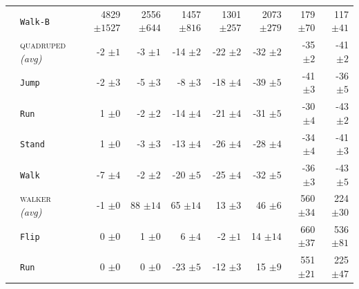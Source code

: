 \documentclass{article}
\theoremstyle{plain}
\theoremstyle{definition}
\theoremstyle{remark}
\newcommand{\domainavg}[1]{\textsc{#1} \textit{(avg)}}
\begin{document}
\begin{table}[H]
\begin{tabular}{l l r r r r r r r}
& \hspace{.5em} \texttt{Walk-B} & 4829 ${\scriptstyle \pm 1527}$ & 2556 ${\scriptstyle \pm 644}$ & 1457 ${\scriptstyle \pm 816}$ & 1301 ${\scriptstyle \pm 257}$ & 2073 ${\scriptstyle \pm 279}$ & 179 ${\scriptstyle \pm 70}$ & 117 ${\scriptstyle \pm 41}$ \\
\addlinespace
 \rowcolor{gray!15}  \cellcolor{white} & \domainavg{quadruped} & -2 ${\scriptstyle \pm 1}$ & -3 ${\scriptstyle \pm 1}$ & -14 ${\scriptstyle \pm 2}$ & -22 ${\scriptstyle \pm 2}$ & -32 ${\scriptstyle \pm 2}$ & -35 ${\scriptstyle \pm 2}$ & -41 ${\scriptstyle \pm 2}$ \\
& \hspace{.5em} \texttt{Jump} & -2 ${\scriptstyle \pm 3}$ & -5 ${\scriptstyle \pm 3}$ & -8 ${\scriptstyle \pm 3}$ & -18 ${\scriptstyle \pm 4}$ & -39 ${\scriptstyle \pm 5}$ & -41 ${\scriptstyle \pm 3}$ & -36 ${\scriptstyle \pm 5}$ \\
& \hspace{.5em} \texttt{Run} & 1 ${\scriptstyle \pm 0}$ & -2 ${\scriptstyle \pm 2}$ & -14 ${\scriptstyle \pm 4}$ & -21 ${\scriptstyle \pm 4}$ & -31 ${\scriptstyle \pm 5}$ & -30 ${\scriptstyle \pm 4}$ & -43 ${\scriptstyle \pm 2}$ \\
& \hspace{.5em} \texttt{Stand} & 1 ${\scriptstyle \pm 0}$ & -3 ${\scriptstyle \pm 3}$ & -13 ${\scriptstyle \pm 4}$ & -26 ${\scriptstyle \pm 4}$ & -28 ${\scriptstyle \pm 4}$ & -34 ${\scriptstyle \pm 4}$ & -41 ${\scriptstyle \pm 3}$ \\
& \hspace{.5em} \texttt{Walk} & -7 ${\scriptstyle \pm 4}$ & -2 ${\scriptstyle \pm 2}$ & -20 ${\scriptstyle \pm 5}$ & -25 ${\scriptstyle \pm 4}$ & -32 ${\scriptstyle \pm 5}$ & -36 ${\scriptstyle \pm 3}$ & -43 ${\scriptstyle \pm 5}$ \\
\addlinespace
 \rowcolor{gray!15}  \cellcolor{white} & \domainavg{walker} & -1 ${\scriptstyle \pm 0}$ & 88 ${\scriptstyle \pm 14}$ & 65 ${\scriptstyle \pm 14}$ & 13 ${\scriptstyle \pm 3}$ & 46 ${\scriptstyle \pm 6}$ & 560 ${\scriptstyle \pm 34}$ & 224 ${\scriptstyle \pm 30}$ \\
& \hspace{.5em} \texttt{Flip} & 0 ${\scriptstyle \pm 0}$ & 1 ${\scriptstyle \pm 0}$ & 6 ${\scriptstyle \pm 4}$ & -2 ${\scriptstyle \pm 1}$ & 14 ${\scriptstyle \pm 14}$ & 660 ${\scriptstyle \pm 37}$ & 536 ${\scriptstyle \pm 81}$ \\
& \hspace{.5em} \texttt{Run} & 0 ${\scriptstyle \pm 0}$ & 0 ${\scriptstyle \pm 0}$ & -23 ${\scriptstyle \pm 5}$ & -12 ${\scriptstyle \pm 3}$ & 15 ${\scriptstyle \pm 9}$ & 551 ${\scriptstyle \pm 21}$ & 225 ${\scriptstyle \pm 47}$ \\

\end{tabular}
\end{table}
\end{document}
